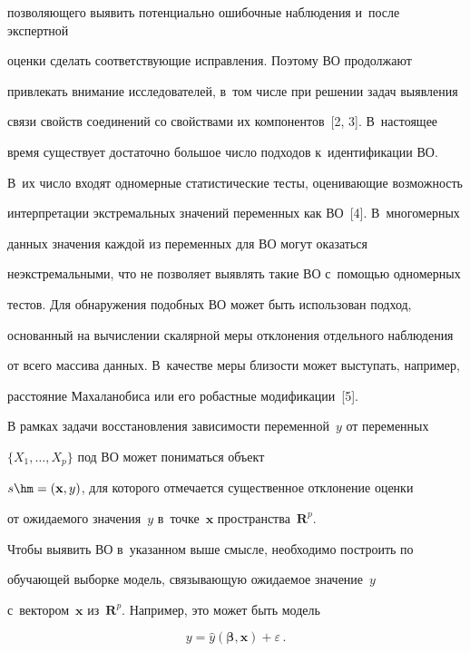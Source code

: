 позволяющего выявить потенциально ошибочные наблюдения и~после экспертной 

оценки сделать соответствующие исправления. Поэтому ВО продолжают 

привлекать внимание исследователей, в~том числе при решении задач выявления 

связи свойств соединений со свойствами их компонентов~[2, 3]. В~настоящее 

время существует достаточно большое число подходов к~идентификации ВО. 

В~их число входят одномерные статистические тесты, оценивающие возможность 

интерпретации экстремальных значений переменных как ВО~[4]. В~многомерных 

данных значения каждой из переменных для ВО могут оказаться 

неэкстремальными, что не позволяет выявлять такие ВО с~помощью одномерных 

тестов. Для обнаружения подобных ВО может быть использован подход, 

основанный на вычислении скалярной меры отклонения отдельного наблюдения 

от всего массива данных. В~качестве меры близости может выступать, например, 

расстояние Махаланобиса или его робастные модификации~[5]. 

  

  В рамках задачи восстановления зависимости переменной~$y$ от переменных 

$\{X_1,\ldots , X_p\}$ под ВО может пониматься объект 

$s\hm=(\mathbf{x},y)$, для которого отмечается существенное отклонение оценки 

от ожидаемого значения~$y$ в~точке~$\mathbf{x}$ пространства~$\mathbf{R}^p$. 

Чтобы выявить ВО в~указанном выше смысле, необходимо построить по 

обучающей выборке модель, связывающую ожидаемое значение~$y$ 

с~вектором~$\mathbf{x}$ из~$\mathbf{R}^p$. Например, это может быть модель

  \begin{equation}

  y=\hat{y}\left(\boldsymbol{\beta}, \mathbf{x}\right)+\varepsilon\,.

  \label{e1-o}

  \end{equation}

